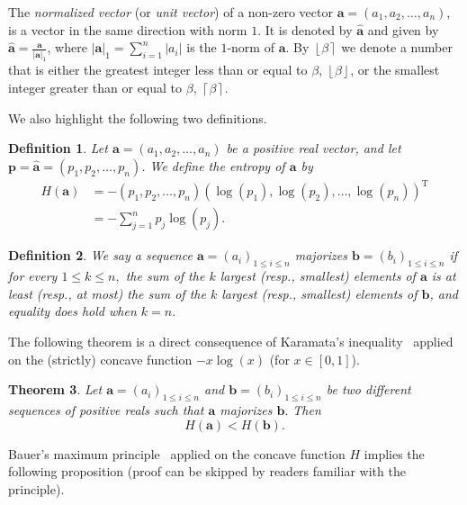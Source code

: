 \documentclass{article}
\newtheorem{defi}{Definition}
\newtheorem{thr}[defi]{Theorem}
\newcommand*{\floorceil}[1]{\left\lfloor #1\right\rceil}
\newcommand*{\bceil}[1]{\left\lceil #1\right\rceil}
\newcommand*{\bfloor}[1]{\left\lfloor #1\right\rfloor}
\newcommand*{\abs}[1]{\lvert #1\rvert}
\def \b{\beta}
\begin{document}
{The {\em normalized vector} (or {\em unit vector}) of a non-zero vector $\mathbf{a}=(a_1, a_2, \ldots, a_n)$, is a vector in the same direction with norm $1$. It is denoted by $\widehat{\mathbf{a}}$ and given by $\widehat{\mathbf{a}}=\frac{\mathbf{a}}{\abs{\mathbf{a}}_1}$, where $\abs{\mathbf{a}}_1=\sum_{i=1}^n \abs{a_i}$ is the $1$-norm of $\mathbf{a}$. 
By $\floorceil{\b}$ we denote a number that is either the greatest integer less than or equal to $\b$, $\bfloor \b$, or the smallest integer greater than or equal to $\b$, $\bceil \b$.

We also highlight the following two definitions.

\begin{defi}
Let $\mathbf{a}=(a_1,a_2,\ldots,a_n)$ be a positive real vector, and let $\mathbf{p}=\widehat{\mathbf{a}}=(p_1,p_2,\ldots,p_n)$. We define the entropy of $\mathbf{a}$ by
\begin{align*}
H(\mathbf{a})&=-(p_1,p_2,\ldots,p_n)(\log(p_1),\log(p_2),\ldots,\log(p_n))^{\mathrm{T}}\\
                 &=-\sum_{j=1}^{n} p_j\log(p_j).
\end{align*}
\end{defi}

\begin{defi}
    We say a sequence $\mathbf{a}=(a_i)_{1 \le i \le n}$ majorizes $\mathbf{b}=(b_i)_{1 \le i \le n}$
    if for every $1 \le k \le n,$ the sum of the $k$ largest (resp., smallest) elements of $\mathbf{a}$ is at least (resp., at most) the sum of the $k$ largest (resp., smallest) elements of $\mathbf{b}$, and equality does hold when $k=n.$
\end{defi}

The following theorem is a direct consequence of Karamata's inequality~\cite{Karamata32} applied on the (strictly) concave function $-x \log(x)$ (for $x \in [0,1]$).

\begin{thr}\label{thr:majorized_Hineq}
    Let $\mathbf{a}=(a_i)_{1 \le i \le n}$ and $\mathbf{b}=(b_i)_{1 \le i \le n}$ be two different sequences of positive reals such that $\mathbf{a}$ majorizes $\mathbf{b}.$
    Then  $$H(\mathbf{a})<H(\mathbf{b}).$$
\end{thr}

Bauer's maximum principle~\cite{Bauer58} applied on the concave function $H$ implies the following proposition (proof can be skipped by readers familiar with the principle).

}
\end{document}
